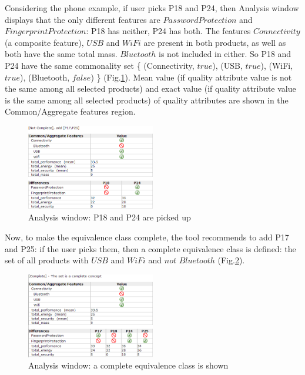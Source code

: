 \documentclass{acm_proc_article-sp}
\begin{document}
Considering the phone example, if user picks P18 and P24, then Analysis window displays that the only different features are $PasswordProtection$ and $FingerprintProtection$: P18 has neither, P24 has both. The features $Connectivity$ (a composite feature), $USB$ and $WiFi$ are present in both products, as well as both have the same total mass. $Bluetooth$ is not included in either. So P18 and P24 have the same commonality set \{ (Connectivity, $true$), (USB, $true$), (WiFi, $true$), (Bluetooth, $false$) \} (Fig.\ref{fig:analysispartial}). Mean value (if quality attribute value is not the same among all selected products) and exact value (if quality attribute value is the same among all selected products) of quality attributes are shown in the Common/Aggregate features region.

\begin{figure}[h]
\includegraphics[width=0.5\textwidth]{analysispartial.png}
\caption{Analysis window: P18 and P24 are picked up}    
  \label{fig:analysispartial}
\end{figure}

Now, to make the equivalence class complete, the tool recommends to add P17 and P25: if the user picks them, then a complete equivalence class is defined: the set of all products with $USB$ and $WiFi$ and $not$ $Bluetooth$ (Fig.\ref{fig:analysisfull}). 

\begin{figure}[h]
\includegraphics[width=0.5\textwidth]{analysisfull.png}
\caption{Analysis window: a complete equivalence class is shown}    
  \label{fig:analysisfull}
\end{figure}
\end{document}
